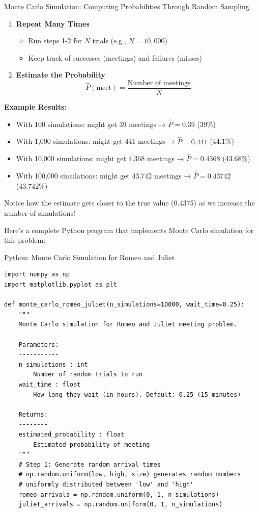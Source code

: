 \begin{itemize}
\begin{keyconceptboxbreak}{Monte Carlo Simulation: Computing Probabilities Through Random Sampling}
\begin{enumerate}
    \item \textbf{Repeat Many Times}
    \begin{itemize}
        \item Run steps 1-2 for $N$ trials (e.g., $N = 10{,}000$)
        \item Keep track of successes (meetings) and failures (misses)
    \end{itemize}

    \item \textbf{Estimate the Probability}
    \[
    \hat{P}(\text{meet}) = \frac{\text{Number of meetings}}{N}
    \]
\end{enumerate}

\textbf{Example Results:}
\begin{itemize}
    \item With 100 simulations: might get 39 meetings → $\hat{P} = 0.39$ (39\%)
    \item With 1,000 simulations: might get 441 meetings → $\hat{P} = 0.441$ (44.1\%)
    \item With 10,000 simulations: might get 4,368 meetings → $\hat{P} = 0.4368$ (43.68\%)
    \item With 100,000 simulations: might get 43,742 meetings → $\hat{P} = 0.43742$ (43.742\%)
\end{itemize}

Notice how the estimate gets closer to the true value (0.4375) as we increase the number of simulations!


Here's a complete Python program that implements Monte Carlo simulation for this problem:

\end{keyconceptboxbreak}

\begin{codeblock}{Python: Monte Carlo Simulation for Romeo and Juliet}
\begin{lstlisting}
import numpy as np
import matplotlib.pyplot as plt

def monte_carlo_romeo_juliet(n_simulations=10000, wait_time=0.25):
    """
    Monte Carlo simulation for Romeo and Juliet meeting problem.

    Parameters:
    -----------
    n_simulations : int
        Number of random trials to run
    wait_time : float
        How long they wait (in hours). Default: 0.25 (15 minutes)

    Returns:
    --------
    estimated_probability : float
        Estimated probability of meeting
    """
    # Step 1: Generate random arrival times
    # np.random.uniform(low, high, size) generates random numbers
    # uniformly distributed between 'low' and 'high'
    romeo_arrivals = np.random.uniform(0, 1, n_simulations)
    juliet_arrivals = np.random.uniform(0, 1, n_simulations)


\end{lstlisting}
\end{codeblock}
\end{itemize}
